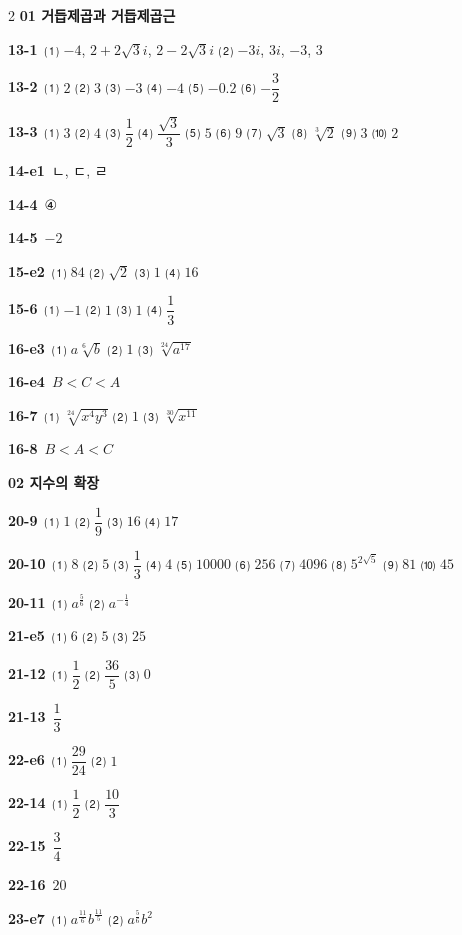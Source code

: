 \documentclass[10pt,a4paper]{article}
\begin{document}
\begin{multicols}{2}\small
\noindent\textbf{01 거듭제곱과 거듭제곱근}\par\smallskip
\noindent\textbf{13-1}\ ⑴ $-4$, $2+2\sqrt{3}i$, $2-2\sqrt{3}i$ ⑵ $-3i$, $3i$, $-3$, $3$\par
\noindent\textbf{13-2}\ ⑴ $2$ ⑵ $3$ ⑶ $-3$ ⑷ $-4$ ⑸ $-0.2$ ⑹ $-\dfrac{3}{2}$\par
\noindent\textbf{13-3}\ ⑴ $3$ ⑵ $4$ ⑶ $\dfrac{1}{2}$ ⑷ $\dfrac{\sqrt{3}}{3}$ ⑸ $5$ ⑹ $9$ ⑺ $\sqrt{3}$ ⑻ $\sqrt[3]{2}$ ⑼ $3$ ⑽ $2$\par
\noindent\textbf{14-e1}\ ㄴ, ㄷ, ㄹ\par
\noindent\textbf{14-4}\ ④\par
\noindent\textbf{14-5}\ $-2$\par
\noindent\textbf{15-e2}\ ⑴ $84$ ⑵ $\sqrt{2}$ ⑶ $1$ ⑷ $16$\par
\noindent\textbf{15-6}\ ⑴ $-1$ ⑵ $1$ ⑶ $1$ ⑷ $\dfrac{1}{3}$\par
\noindent\textbf{16-e3}\ ⑴ $a\sqrt[6]{b}$ ⑵ $1$ ⑶ $\sqrt[24]{a^{17}}$\par
\noindent\textbf{16-e4}\ $B<C<A$\par
\noindent\textbf{16-7}\ ⑴ $\sqrt[24]{x^4y^3}$ ⑵ $1$ ⑶ $\sqrt[30]{x^{11}}$\par
\noindent\textbf{16-8}\ $B<A<C$\par
\noindent\textbf{02 지수의 확장}\par\smallskip
\noindent\textbf{20-9}\ ⑴ $1$ ⑵ $\dfrac{1}{9}$ ⑶ $16$ ⑷ $17$\par
\noindent\textbf{20-10}\ ⑴ $8$ ⑵ $5$ ⑶ $\dfrac{1}{3}$ ⑷ $4$ ⑸ $10000$ ⑹ $256$ ⑺ $4096$ ⑻ $5^{2\sqrt{5}}$ ⑼ $81$ ⑽ $45$\par
\noindent\textbf{20-11}\ ⑴ $a^{\frac{5}{6}}$ ⑵ $a^{-\frac{1}{4}}$\par
\noindent\textbf{21-e5}\ ⑴ $6$ ⑵ $5$ ⑶ $25$\par
\noindent\textbf{21-12}\ ⑴ $\dfrac{1}{2}$ ⑵ $\dfrac{36}{5}$ ⑶ $0$\par
\noindent\textbf{21-13}\ $\dfrac{1}{3}$\par
\noindent\textbf{22-e6}\ ⑴ $\dfrac{29}{24}$ ⑵ $1$\par
\noindent\textbf{22-14}\ ⑴ $\dfrac{1}{2}$ ⑵ $\dfrac{10}{3}$\par
\noindent\textbf{22-15}\ $\dfrac{3}{4}$\par
\noindent\textbf{22-16}\ $20$\par
\noindent\textbf{23-e7}\ ⑴ $a^{\frac{11}{6}}b^{\frac{11}{5}}$ ⑵ $a^{\frac{5}{6}}b^{2}$\par

\end{multicols}
\end{document}

